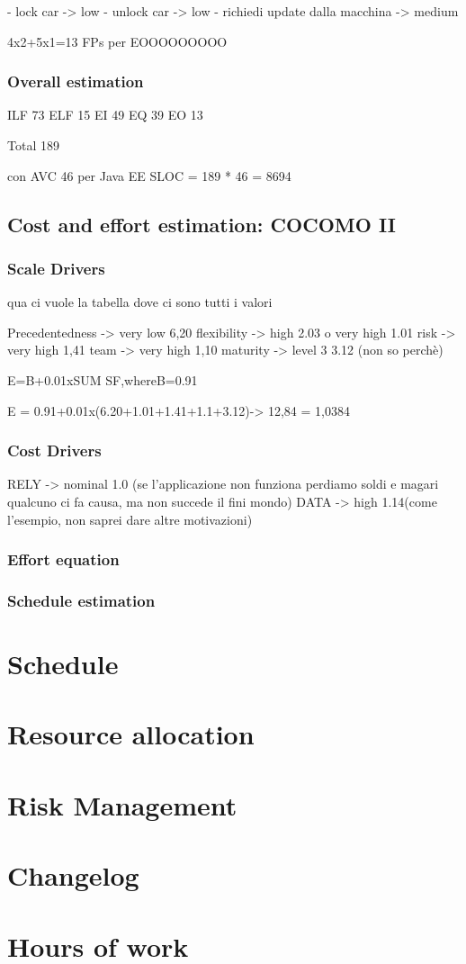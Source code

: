 \documentclass[english]{article}
\begin{document}
- lock car -> low
- unlock car -> low
- richiedi update dalla macchina -> medium

4x2+5x1=13 FPs per EOOOOOOOOO

\subsubsection{Overall estimation}

ILF 73
ELF 15
EI 49
EQ 39
EO 13

Total 189

con AVC 46 per Java EE
SLOC = 189 * 46 = 8694


\subsection{Cost and effort estimation: COCOMO II}


\subsubsection{Scale Drivers}

qua ci vuole la tabella dove ci sono tutti i valori

Precedentedness -> very low 6,20
flexibility -> high 2.03 o very high 1.01
risk -> very high 1,41
team -> very high 1,10
maturity -> level 3 3.12 (non so perchè)


E=B+0.01xSUM SF,whereB=0.91

E = 0.91+0.01x(6.20+1.01+1.41+1.1+3.12)-> 12,84 = 1,0384 

\subsubsection{Cost Drivers}

RELY -> nominal 1.0 (se l'applicazione non funziona perdiamo soldi e magari qualcuno ci fa causa, ma non succede il fini mondo)
DATA -> high 1.14(come l'esempio, non saprei dare altre motivazioni)


\subsubsection{Effort equation}

\subsubsection{Schedule estimation}


\section{Schedule}


\section{Resource allocation}


\section{Risk Management}

\appendix

\section{Changelog}

\section{Hours of work}
\end{document}
